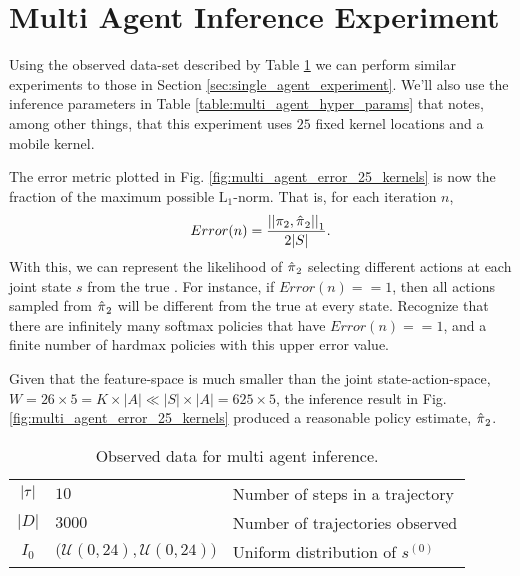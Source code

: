 \section{Multi Agent Inference Experiment}\label{sec:multi_agent_inference_experiment}
Using the observed data-set described by Table \ref{table:multi_agent_data_set} we can perform similar experiments to
those in Section \ref{sec:single_agent_experiment}. We'll also use the inference parameters in Table
\ref{table:multi_agent_hyper_params} that notes, among other things, that this experiment uses $25$ fixed kernel
locations and a mobile kernel.

The error metric plotted in Fig. \ref{fig:multi_agent_error_25_kernels} is now the fraction of the maximum possible
$\text{L}_1$-norm. That is, for each iteration $n$,
\begin{equation}\label{eq:error_percent}
        Error(n) = \frac{\left|\left|\pi_{2},\hat{\pi_{}}_2\right|\right|_1}{2|S|}.
\end{equation}
With this, we can represent the likelihood of $\hat{\pi_{}}_2$ selecting different actions at each joint state
$s$ from the true . For instance, if $Error(n)==1$, then all actions sampled from $\hat{\pi_{}}_2$
will be different from the true  at every state. Recognize that there are infinitely many softmax policies
that have $Error(n)==1$, and a finite number of hardmax policies with this upper error value.

Given that the feature-space is much smaller than the joint state-action-space, $W = 26 \times 5 = K \times |A| \ll
|S|\times |A| = 625 \times 5$, the inference result in Fig. \ref{fig:multi_agent_error_25_kernels} produced a reasonable
policy estimate, $\hat{\pi_{}}_2$.


\begin{table}[H]
        \centering
        \begin{tabular}{c|l l}
                $|\tau|$ & $10$ & Number of steps in a trajectory \\
                $|D|$ & $3000$ & Number of trajectories observed \\
                $I_0$ & $\big(\mathcal{U}(0,24), \mathcal{U}(0,24)\big)$ & Uniform distribution of $s^{(0)}$ \\
        \end{tabular}
        \caption{Observed data for multi agent inference.}
        \label{table:multi_agent_data_set}
\end{table}

